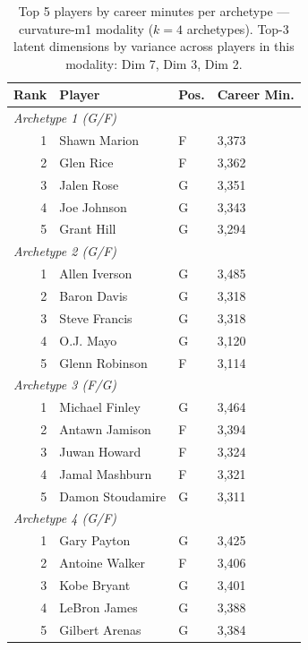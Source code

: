 \begin{table}[htbp]
  \centering\small
  \begin{tabular}{rlll}
    \toprule
    Rank & Player & Pos. & Career Min. \\
    \midrule
    \multicolumn{4}{l}{\textit{Archetype 1 (G/F)}} \\
    \midrule
    1 & Shawn Marion & F & 3,373 \\
    2 & Glen Rice & F & 3,362 \\
    3 & Jalen Rose & G & 3,351 \\
    4 & Joe Johnson & G & 3,343 \\
    5 & Grant Hill & G & 3,294 \\
    \midrule[0.4pt]
    \multicolumn{4}{l}{\textit{Archetype 2 (G/F)}} \\
    \midrule
    1 & Allen Iverson & G & 3,485 \\
    2 & Baron Davis & G & 3,318 \\
    3 & Steve Francis & G & 3,318 \\
    4 & O.J. Mayo & G & 3,120 \\
    5 & Glenn Robinson & F & 3,114 \\
    \midrule[0.4pt]
    \multicolumn{4}{l}{\textit{Archetype 3 (F/G)}} \\
    \midrule
    1 & Michael Finley & G & 3,464 \\
    2 & Antawn Jamison & F & 3,394 \\
    3 & Juwan Howard & F & 3,324 \\
    4 & Jamal Mashburn & F & 3,321 \\
    5 & Damon Stoudamire & G & 3,311 \\
    \midrule[0.4pt]
    \multicolumn{4}{l}{\textit{Archetype 4 (G/F)}} \\
    \midrule
    1 & Gary Payton & G & 3,425 \\
    2 & Antoine Walker & F & 3,406 \\
    3 & Kobe Bryant & G & 3,401 \\
    4 & LeBron James & G & 3,388 \\
    5 & Gilbert Arenas & G & 3,384 \\
    \bottomrule
  \end{tabular}
  \caption{Top 5 players by career minutes per archetype --- curvature-m1 modality ($k=4$ archetypes). Top-3 latent dimensions by variance across players in this modality: Dim 7, Dim 3, Dim 2.}
  \label{tab:arch_reps_curvature_m1}
\end{table}

